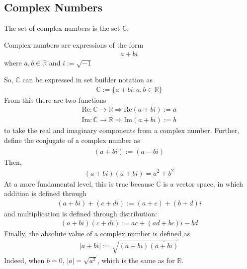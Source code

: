 \subsection{Complex Numbers}
The set of complex numbers is the set $\mathbb{C}$.
\begin{definition}
    Complex numbers are expressions of the form
    \begin{align}
        a + bi
    \end{align}
    where $a, b \in \mathbb{R}$ and $i := \sqrt{-1}$
\end{definition}
So, $\mathbb{C}$ can be expressed in set builder notation as
\begin{align}
    \mathbb{C} := \{ a+bi : a,b \in \mathbb{R} \}
\end{align}
From this there are two functions
\begin{align}
    \text{Re}: \mathbb{C} \to \mathbb{R} \Rightarrow \text{Re}(a+bi):=a\\
    \text{Im}: \mathbb{C} \to \mathbb{R} \Rightarrow \text{Im}(a+bi):=b
\end{align}
to take the real and imaginary components from a complex number. Further, define the conjugate of a complex number as
\begin{align}
    \overline{(a+bi)} := (a-bi)
\end{align}
Then,
\begin{align}
    (a+bi)\overline{(a+bi)} = a^2 + b^2
\end{align}
At a more fundamental level, this is true because $\mathbb{C}$ is a vector space, in which addition is defined through
\begin{align}
    (a+bi) + (c+di) := (a+c) + (b+d)i
\end{align}
and multiplication is defined through distribution:
\begin{align}
    (a+bi)(c+di) := ac + (ad + bc)i - bd
\end{align}
Finally, the absolute value of a complex number is defined as
\begin{align}
    |a + bi| := \sqrt{(a+bi)\overline{(a+bi)}}
\end{align}
Indeed, when $b=0$, $|a| = \sqrt{a^2}$, which is the same as for $\mathbb{R}$.